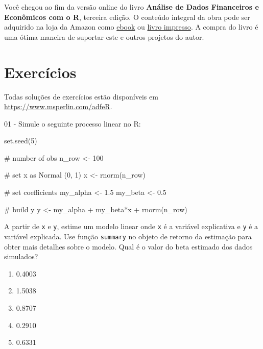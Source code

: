 \documentclass[
  11pt,
]{book}
\newenvironment{Shaded}{\begin{snugshade}}{\end{snugshade}}
\newcommand{\NormalTok}[1]{#1}
\providecommand{\tightlist}{%
  \setlength{\itemsep}{0pt}\setlength{\parskip}{0pt}}
\newenvironment{pleasebuyit}
{\begin{noteblock}
		
	} {\end{noteblock}}
\begin{document}
\begin{pleasebuyit}
Você chegou ao fim da versão online do livro \textbf{Análise de Dados
Financeiros e Econômicos com o R}, terceira edição. O conteúdo integral
da obra pode ser adquirido na loja da Amazon como
\href{https://www.amazon.com.br/dp/B08WNC27ZY}{ebook} ou
\href{https://www.amazon.com/dp/B08WP8CCDB}{livro impresso}. A compra do
livro é uma ótima maneira de suportar este e outros projetos do autor.
\end{pleasebuyit}

\hypertarget{exerc-modelos}{%
\section{Exercícios}\label{exerc-modelos}}

Todas soluções de exercícios estão disponíveis em \url{https://www.msperlin.com/adfeR}.

01 -
Simule o seguinte processo linear no R:

\begin{Shaded}
\begin{Highlighting}[]
\NormalTok{set.seed(5)}

\NormalTok{\# number of obs}
\NormalTok{n\_row \textless{}{-} 100}

\NormalTok{\# set x as Normal (0, 1)}
\NormalTok{x \textless{}{-} rnorm(n\_row)}

\NormalTok{\# set coefficients}
\NormalTok{my\_alpha \textless{}{-} 1.5}
\NormalTok{my\_beta \textless{}{-} 0.5}

\NormalTok{\# build y}
\NormalTok{y \textless{}{-} my\_alpha + my\_beta*x + rnorm(n\_row)}
\end{Highlighting}
\end{Shaded}

A partir de \texttt{x} e \texttt{y}, estime um modelo linear onde \texttt{x} é a variável explicativa e \texttt{y} é a variável explicada. Use função \texttt{summary} no objeto de retorno da estimação para obter mais detalhes sobre o modelo. Qual é o valor do beta estimado dos dados simulados?

\begin{enumerate}
\def\labelenumi{\alph{enumi})}
\tightlist
\item
  0.4003
\item
  1.5038
\item
  0.8707
\item
  0.2910
\item
  0.6331
\end{enumerate}
\end{document}
